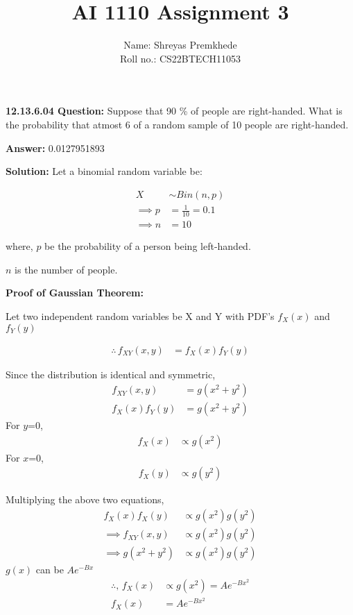\documentclass[journal,12pt,twocolumn]{IEEEtran}
\title{AI 1110 Assignment 3}
\theoremstyle{remark}
\begin{document}
\author{Name: Shreyas Premkhede\\Roll no.: CS22BTECH11053}
\maketitle

\textbf{12.13.6.04 Question:} Suppose that 90 \% of people are right-handed. What is the probability that atmost 6 of a random sample of 10 people are right-handed. 


\textbf{Answer:}  0.0127951893


\textbf{Solution: } 
Let a binomial random variable be:

\begin{align} 
X &\sim Bin(n,p)\\
\implies p &= \frac{1}{10} = 0.1\\ 
\implies n &= 10
\end{align}	   

where, $p$ be the probability of a person being left-handed.

$n$ is the number of people.

\textbf{Proof of Gaussian Theorem:}

Let two independent random variables be X and Y with PDF's $f_X(x)$ and $f_Y(y)$

\begin{align}
\therefore \, f_{XY}(x,y) &= f_X(x) f_Y(y)
\end{align}

Since the distribution is identical and symmetric,
\begin{align}
	f_{XY}(x,y) &= g(x^2 + y^2)\\
	f_X(x) f_Y(y)&=g(x^2 + y^2)
\end{align}
For $y$=0,
\begin{align}
f_X(x) &\propto g(x^2)
\end{align}
For $x$=0,
\begin{align}
f_X(y) &\propto g(y^2)
\end{align}


Multiplying the above two equations,
\begin{align}
	f_X(x)f_X(y)&\propto g(x^2) g(y^2)\\
\implies
	f_{XY}(x,y)&\propto g(x^2) g(y^2)\\
\implies
	g(x^2 + y^2)&\propto g(x^2) g(y^2)
\end{align}
\(g(x)\) can be \(Ae^{-Bx}\)
\begin{align}
\therefore, \, f_X(x) &\propto g(x^2) = Ae^{-Bx^2}\\
	f_X(x) &= Ae^{-Bx^2}
\end{align}
\end{document}
